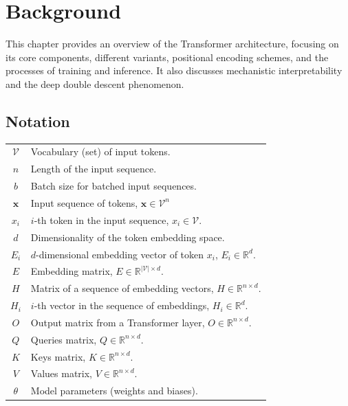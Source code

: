 \chapter{Background}\label{background}


This chapter provides an overview of the Transformer architecture, focusing on its core components, different variants, positional encoding schemes, and the processes of training and inference. It also discusses mechanistic interpretability and the deep double descent phenomenon.

\section*{Notation}\label{sec:notation}

\begin{center}
    \begin{tabular}{cl}
        $\mathcal{V}$ \qquad & Vocabulary (set) of input tokens.                                           \\
        $n$                  & Length of the input sequence.                                               \\
        $b$                  & Batch size for batched input sequences.                                     \\
        $\mathbf{x}$         & Input sequence of tokens, $\mathbf{x} \in \mathcal{V}^{n}$                  \\
        $x_i$                & $i$-th token in the input sequence, $x_i \in \mathcal{V}$.                  \\
        $d$                  & Dimensionality of the token embedding space.                                \\
        $E_i$                & $d$-dimensional embedding vector of token $x_i$, $E_i \in \mathbb{R}^d$.    \\
        $E$                  & Embedding matrix, $E \in \mathbb{R}^{|\mathcal{V}| \times d}$.              \\
        $H$                  & Matrix of a sequence of embedding vectors, $H \in \mathbb{R}^{n \times d}$. \\
        $H_i$                & $i$-th vector in the sequence of embeddings, $H_i \in \mathbb{R}^d$.        \\
        $O$                  & Output matrix from a Transformer layer, $O \in \mathbb{R}^{n \times d}$.    \\
        $Q$                  & Queries matrix, $Q \in \mathbb{R}^{n \times d}$.                            \\
        $K$                  & Keys matrix, $K \in \mathbb{R}^{n \times d}$.                               \\
        $V$                  & Values matrix, $V \in \mathbb{R}^{n \times d}$.                             \\
        $\theta$             & Model parameters (weights and biases).                                      \\
    \end{tabular}
\end{center}

